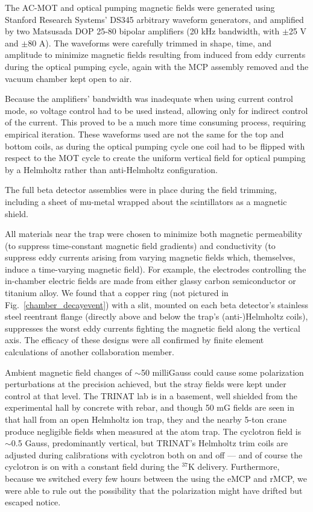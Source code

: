 The AC-MOT and optical pumping magnetic fields were generated using Stanford Research Systems' DS345 arbitrary waveform generators, and amplified by two \mbox{Matsusada} DOP 25-80 bipolar amplifiers (20 kHz bandwidth, with $\pm$25 V and $\pm$80 A).
The waveforms were carefully trimmed in shape, time, and amplitude to minimize magnetic fields resulting from induced from eddy currents during the optical pumping cycle, again with the MCP assembly removed and the vacuum chamber kept open to air.

Because the amplifiers' bandwidth was inadequate when using current control mode, so voltage control had to be used instead, allowing only for indirect control of the current.  This proved to be a much more time consuming process, requiring empirical iteration.  
These waveforms used are not the same for the top and bottom coils, as during the optical pumping cycle one coil had to be flipped with respect to the MOT cycle to create the uniform vertical field for optical pumping by a Helmholtz rather than anti-Helmholtz configuration.


The full beta detector assemblies were in place during the field trimming, including a sheet of mu-metal wrapped about the scintillators as a magnetic shield.  


All materials near the trap were chosen to minimize both magnetic permeability (to suppress time-constant magnetic field gradients) and conductivity (to suppress eddy currents arising from varying magnetic fields which, themselves, induce a time-varying magnetic field).  For example, the electrodes controlling the in-chamber electric fields are made from either glassy carbon semiconductor or titanium alloy.  We found that a 
copper ring (not pictured in Fig.~\ref{chamber_decayevent}) with a slit, mounted on each beta detector's stainless steel reentrant flange (directly above and below the trap's (anti-)Helmholtz coils), suppresses the worst eddy currents fighting the magnetic field along the vertical axis. The efficacy of these designs were all confirmed by finite element calculations of another collaboration member.


Ambient magnetic field changes of $\sim$50 milliGauss could cause some polarization perturbations at the precision achieved, but the stray fields were kept under control at that level.  The TRINAT lab is in a basement, well shielded from the experimental hall by concrete with rebar, and though 50 mG fields are seen in that hall from an open Helmholtz ion trap, they and the nearby 5-ton crane produce negligible fields when measured at the atom trap. The cyclotron field is $\sim$0.5 Gauss, predominantly vertical, 
but TRINAT's Helmholtz trim coils are adjusted during calibrations with cyclotron both on and off --- and of course the cyclotron is on with a constant field during the $^{37}$K delivery.  Furthermore, because we switched every few hours between the using the eMCP and rMCP, we were able to rule out the possibility that the polarization might have drifted but escaped notice.  


